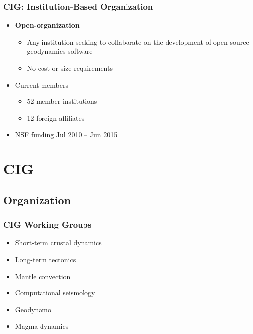 \documentclass{beamer}
\begin{document}
\begin{frame}
  \frametitle{CIG: Institution-Based Organization}
 
  \begin{itemize}
  \item {\bf Open-organization}
    \begin{itemize}
    \item Any institution seeking to collaborate on the development of
      open-source geodynamics software
    \item No cost or size requirements
    \end{itemize}
  \item Current members
    \begin{itemize}
    \item 52 member institutions
    \item 12 foreign affiliates
    \end{itemize}
  \item NSF funding Jul 2010 -- Jun 2015
 \end{itemize}
\end{frame}


\section{CIG}
\subsection{Organization}

\begin{frame}
  \frametitle{CIG Working Groups}
 
 \begin{itemize}
 \item Short-term crustal dynamics
 \item Long-term tectonics
 \item Mantle convection
 \item Computational seismology
 \item Geodynamo
 \item Magma dynamics
 \end{itemize}

\end{frame}
\end{document}
